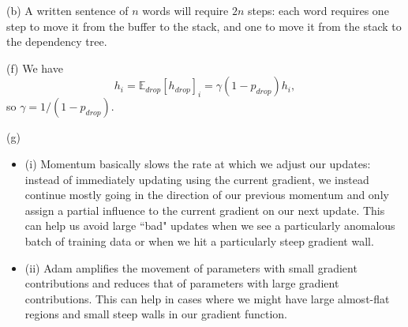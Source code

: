\documentclass{article}
\begin{document}
(b) A written sentence of $n$ words will require $2n$ steps: each word requires one step to move it from the buffer to the stack, and one to move it from the stack to the dependency tree.

(f) We have
$$ h_i = \mathbb{E}_{drop}[h_{drop}]_i = \gamma (1 - p_{drop}) h_i,$$
so $\gamma = 1/(1 - p_{drop})$.

(g)
\begin{itemize}
\item (i) Momentum basically slows the rate at which we adjust our updates: instead of immediately updating using the current gradient, we instead continue mostly going in the direction of our previous momentum and only assign a partial influence to the current gradient on our next update. This can help us avoid large ``bad" updates when we see a particularly anomalous batch of training data or when we hit a particularly steep gradient wall.
\item (ii) Adam amplifies the movement of parameters with small gradient contributions and reduces that of parameters with large gradient contributions. This can help in cases where we might have large almost-flat regions and small steep walls in our gradient function.
\end{itemize}
\end{document}
